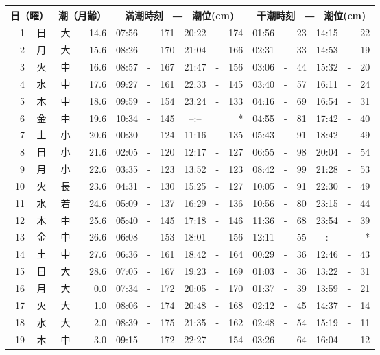\documentclass[12pt.a4j]{jsarticle}
\begin{document}
\begin{center}
\begin{table}[ht]
\begin{tabular}{|rc|cr|ccrccr|ccrccr|}
\hline
\multicolumn{2}{|c|}{日（曜）} & \multicolumn{2}{c|}{潮（月齢）} & \multicolumn{6}{c|}{満潮時刻　―　潮位(cm)} & \multicolumn{6}{c|}{干潮時刻　―　潮位(cm)} \\
\hline
 1 & 日 & 大 & 14.6 & 07:56 &-& 171 & 20:22 &-& 174 & 01:56 &-&  23 & 14:15 &-&  22 \\
 2 & 月 & 大 & 15.6 & 08:26 &-& 170 & 21:04 &-& 166 & 02:31 &-&  33 & 14:53 &-&  19 \\
 3 & 火 & 中 & 16.6 & 08:57 &-& 167 & 21:47 &-& 156 & 03:06 &-&  44 & 15:32 &-&  20 \\
 4 & 水 & 中 & 17.6 & 09:27 &-& 161 & 22:33 &-& 145 & 03:40 &-&  57 & 16:11 &-&  24 \\
 5 & 木 & 中 & 18.6 & 09:59 &-& 154 & 23:24 &-& 133 & 04:16 &-&  69 & 16:54 &-&  31 \\
 6 & 金 & 中 & 19.6 & 10:34 &-& 145 & --:-- & &  *  & 04:55 &-&  81 & 17:42 &-&  40 \\
 7 & 土 & 小 & 20.6 & 00:30 &-& 124 & 11:16 &-& 135 & 05:43 &-&  91 & 18:42 &-&  49 \\
 8 & 日 & 小 & 21.6 & 02:05 &-& 120 & 12:17 &-& 127 & 06:55 &-&  98 & 20:04 &-&  54 \\
 9 & 月 & 小 & 22.6 & 03:35 &-& 123 & 13:52 &-& 123 & 08:42 &-&  99 & 21:28 &-&  53 \\
10 & 火 & 長 & 23.6 & 04:31 &-& 130 & 15:25 &-& 127 & 10:05 &-&  91 & 22:30 &-&  49 \\
11 & 水 & 若 & 24.6 & 05:09 &-& 137 & 16:29 &-& 136 & 10:56 &-&  80 & 23:15 &-&  44 \\
12 & 木 & 中 & 25.6 & 05:40 &-& 145 & 17:18 &-& 146 & 11:36 &-&  68 & 23:54 &-&  39 \\
13 & 金 & 中 & 26.6 & 06:08 &-& 153 & 18:01 &-& 156 & 12:11 &-&  55 & --:-- & &  *  \\
14 & 土 & 中 & 27.6 & 06:36 &-& 161 & 18:42 &-& 164 & 00:29 &-&  36 & 12:46 &-&  43 \\
15 & 日 & 大 & 28.6 & 07:05 &-& 167 & 19:23 &-& 169 & 01:03 &-&  36 & 13:22 &-&  31 \\
16 & 月 & 大 &  0.0 & 07:34 &-& 172 & 20:05 &-& 170 & 01:37 &-&  39 & 13:59 &-&  21 \\
17 & 火 & 大 &  1.0 & 08:06 &-& 174 & 20:48 &-& 168 & 02:12 &-&  45 & 14:37 &-&  14 \\
18 & 水 & 大 &  2.0 & 08:39 &-& 175 & 21:35 &-& 162 & 02:48 &-&  54 & 15:19 &-&  11 \\
19 & 木 & 中 &  3.0 & 09:15 &-& 172 & 22:27 &-& 154 & 03:26 &-&  64 & 16:04 &-&  12 \\

\end{tabular}
\end{table}
\end{center}
\end{document}
